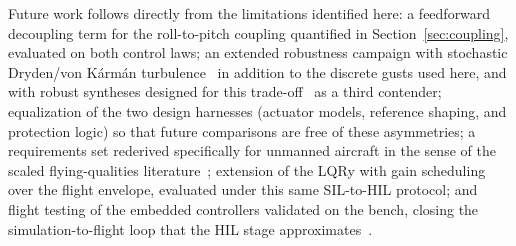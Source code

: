 Future work follows directly from the limitations identified here: a
feedforward decoupling term for the roll-to-pitch coupling quantified
in Section~\ref{sec:coupling}, evaluated on both control laws; an
extended robustness campaign with stochastic Dryden/von K\'arm\'an
turbulence~\cite{milf8785c1980,milhdbk1797} in addition to the
discrete gusts used here, and with robust syntheses designed for this
trade-off~\cite{abdulhamid2016robusto} as a third contender;
equalization of the two design harnesses (actuator models, reference
shaping, and protection logic) so that future comparisons are free of
these asymmetries; a requirements set rederived specifically for
unmanned aircraft in the sense of the scaled flying-qualities
literature~\cite{cotting2010evolution,greene2014toward};
extension of the LQRy with gain scheduling over the flight envelope,
evaluated under this same SIL-to-HIL protocol; and flight
testing of the embedded controllers validated on the bench, closing
the simulation-to-flight loop that the HIL stage
approximates~\cite{shen2025model}.
